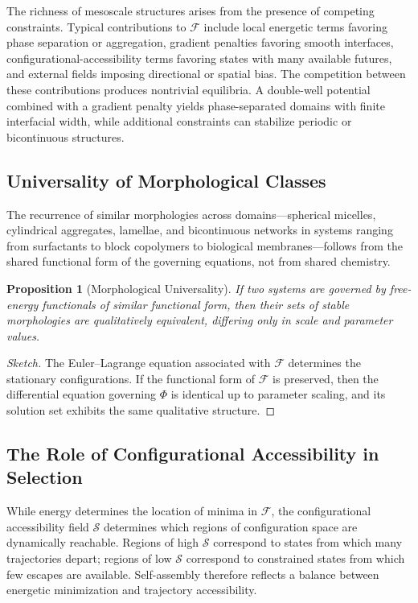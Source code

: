 \documentclass[11pt, a4paper, twocolumn]{article}
\newtheorem{proposition}[definition]{Proposition}
\newcommand{\Sfield}{\mathcal{S}}
\newcommand{\F}{\mathcal{F}}
\begin{document}
The richness of mesoscale structures arises from the presence of competing
constraints. Typical contributions to $\F$ include local energetic terms
favoring phase separation or aggregation, gradient penalties favoring smooth
interfaces, configurational-accessibility terms favoring states with many
available futures, and external fields imposing directional or spatial bias.
The competition between these contributions produces nontrivial equilibria.
A double-well potential combined with a gradient penalty yields phase-separated
domains with finite interfacial width, while additional constraints can
stabilize periodic or bicontinuous structures.

\subsection{Universality of Morphological Classes}

The recurrence of similar morphologies across domains---spherical micelles,
cylindrical aggregates, lamellae, and bicontinuous networks in systems ranging
from surfactants to block copolymers to biological membranes---follows from the
shared functional form of the governing equations, not from shared chemistry.

\begin{proposition}[Morphological Universality]
If two systems are governed by free-energy functionals of similar functional
form, then their sets of stable morphologies are qualitatively equivalent,
differing only in scale and parameter values.
\end{proposition}

\begin{proof}[Sketch]
The Euler--Lagrange equation associated with $\F$ determines the stationary
configurations. If the functional form of $\F$ is preserved, then the
differential equation governing $\Phi$ is identical up to parameter scaling,
and its solution set exhibits the same qualitative structure.
\end{proof}

\subsection{The Role of Configurational Accessibility in Selection}

While energy determines the location of minima in $\F$, the configurational
accessibility field $\Sfield$ determines which regions of configuration space
are dynamically reachable. Regions of high $\Sfield$ correspond to states from
which many trajectories depart; regions of low $\Sfield$ correspond to
constrained states from which few escapes are available. Self-assembly therefore
reflects a balance between energetic minimization and trajectory accessibility.
\end{document}
